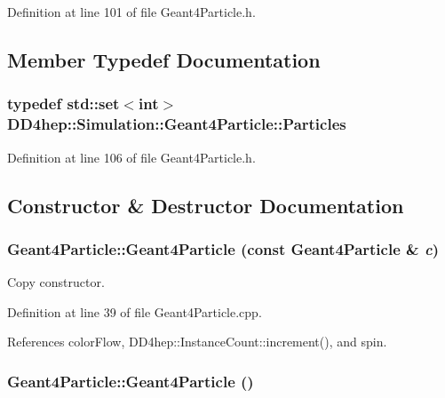 Definition at line 101 of file Geant4Particle.h.

\subsection{Member Typedef Documentation}
\hypertarget{class_d_d4hep_1_1_simulation_1_1_geant4_particle_a123ad778eff51ea80ce778d54776c072}{
\subsubsection[{Particles}]{\setlength{\rightskip}{0pt plus 5cm}typedef std::set$<$int$>$ {\bf DD4hep::Simulation::Geant4Particle::Particles}}}
\label{class_d_d4hep_1_1_simulation_1_1_geant4_particle_a123ad778eff51ea80ce778d54776c072}


Definition at line 106 of file Geant4Particle.h.

\subsection{Constructor \& Destructor Documentation}
\hypertarget{class_d_d4hep_1_1_simulation_1_1_geant4_particle_a4026f75168da7d38053d87a218bcada5}{
\subsubsection[{Geant4Particle}]{\setlength{\rightskip}{0pt plus 5cm}Geant4Particle::Geant4Particle (const {\bf Geant4Particle} \& {\em c})}}
\label{class_d_d4hep_1_1_simulation_1_1_geant4_particle_a4026f75168da7d38053d87a218bcada5}


Copy constructor. 

Definition at line 39 of file Geant4Particle.cpp.

References colorFlow, DD4hep::InstanceCount::increment(), and spin.\hypertarget{class_d_d4hep_1_1_simulation_1_1_geant4_particle_a7fbf091b0805aeada441aa5850a8c660}{
\subsubsection[{Geant4Particle}]{\setlength{\rightskip}{0pt plus 5cm}Geant4Particle::Geant4Particle ()}}
\label{class_d_d4hep_1_1_simulation_1_1_geant4_particle_a7fbf091b0805aeada441aa5850a8c660}


